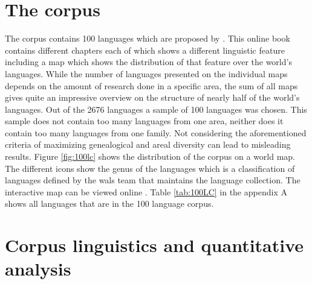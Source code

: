 \label{chap:ling-background}


\section{The corpus}
\label{corpus}
The corpus contains 100 languages which are proposed by \citet{Comrie&Dryer.2013}. This online book contains different chapters each of which shows a different linguistic feature including a map which shows the distribution of that feature over the world's languages. While the number of languages presented on the individual maps depends on the amount of research done in a specific area, the sum of all maps gives quite an impressive overview on the structure of nearly half of the world's languages. Out of the 2676 languages a sample of 100 languages was chosen. This sample does not contain too many languages from one area, neither does it contain too many languages from one family. Not considering the aforementioned criteria of maximizing genealogical and areal diversity can lead to misleading results. Figure \ref{fig:100lc} shows the distribution of the corpus on a world map. The different icons show the genus of the languages which is a classification of languages defined by the \ac{wals} team that maintains the language collection. The interactive map can be viewed online \citep{100LC.21.07.2021}. Table \ref{tab:100LC} in the appendix A shows all languages that are in the 100 language corpus. 


\section{Corpus linguistics and quantitative analysis}

